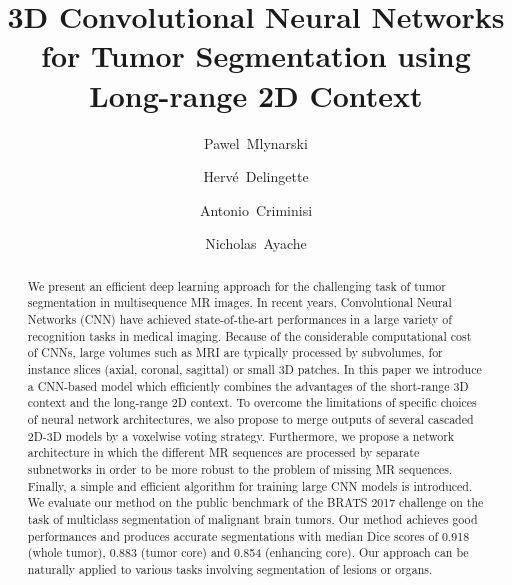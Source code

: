 \documentclass[preprint,12pt]{elsarticle}
\begin{document}
\begin{frontmatter}



\title{3D Convolutional Neural Networks for Tumor Segmentation using Long-range 2D Context}



\author[a]{Pawel~Mlynarski }
\author[a]{Herv\'e~Delingette}
\author[b]{Antonio~Criminisi}
\author[a]{Nicholas~Ayache}
\address[a]{Universit\'e C\^ote d'Azur, Inria Sophia Antipolis, France.}
\address[b]{Microsoft Research Cambridge, United Kingdom.}






\begin{abstract}
We present an efficient deep learning approach for the challenging task of tumor segmentation in multisequence MR images. In recent years, Convolutional Neural Networks (CNN) have achieved state-of-the-art performances in a large variety of recognition tasks in medical imaging. Because of the considerable computational cost of CNNs, large volumes such as MRI are typically processed by subvolumes, for instance slices (axial, coronal, sagittal) or small 3D patches. In this paper we introduce a CNN-based model which efficiently combines the advantages of the short-range 3D context and the long-range 2D context. To overcome the limitations of specific choices of neural network architectures, we also propose to merge outputs of several cascaded 2D-3D models by a voxelwise voting strategy. Furthermore, we propose a network architecture in which the different MR sequences are processed by separate subnetworks in order to be more robust to the problem of missing MR sequences. Finally, a simple and efficient algorithm for training large CNN models is introduced. We evaluate our method on the public benchmark of the BRATS 2017 challenge on the task of multiclass segmentation of malignant brain tumors. Our method achieves good performances and produces accurate segmentations with median Dice scores of 0.918 (whole tumor), 0.883 (tumor core) and 0.854 (enhancing core). Our approach can be naturally applied to various tasks involving segmentation of lesions or organs.
\end{abstract}


\end{frontmatter}
\end{document}
